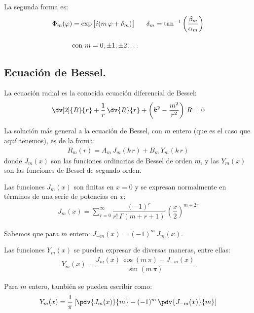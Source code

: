La segunda forma es:
\begin{align*}
\Phi_{m} (\varphi) &= \exp\big[ i (m \, \varphi + \delta_{m}) \big] \hspace{0.6cm} \delta_{m} = \tan^{-1} \left( \dfrac{\beta_{m}}{\alpha_{m}}\right) \\[1em]
&\mbox{con } m = 0, \pm 1, \pm 2, \ldots
\end{align*}

\subsection{Ecuación de Bessel.}

La ecuación radial es la conocida ecuación diferencial de Bessel:
\begin{align*}
\dv[2]{R}{r} + \dfrac{1}{r} \, \dv{R}{r} + \left( k^{2} - \dfrac{m^{2}}{r^{2}} \right) \, R = 0
\end{align*}

La solución más general a la ecuación de Bessel, con $m$ entero (que es el caso que aquí tenemos), es de la forma:
\begin{align*}
R_{m} (r) = A_{m} \, J_{m} (k \, r) + B_{m} \, Y_{m} (k \, r)
\end{align*}
donde $J_{m} (x)$ son las funciones ordinarias de Bessel de orden $m$, y las $Y_{m} (x)$ son las funciones de Bessel de segundo orden.
\par
Las funciones $J_{m} (x)$ son finitas en $x = 0$ y se expresan normalmente en términos de una serie de potencias en $x$:
\begin{align*}
J_{m} (x) = \sum_{r=0}^{\infty} \dfrac{(-1)^{r}}{r! \, \Gamma(m + r + 1)} \, \left( \dfrac{x}{2} \right)^{m+2r}
\end{align*}

Sabemos que para $m$ entero: $J_{-m} (x) = (-1)^{m} \, J_{m} (x)$.
\par
Las funciones $Y_{m} (x)$ se pueden expresar de diversas maneras, entre ellas:
\begin{align*}
Y_{m}(x) = \dfrac{J_{m}(x) \, \cos (m \, \pi) - J_{-m}(x)}{\sin (m \, \pi)}
\end{align*}

Para $m$ entero, también se pueden escribir como:
\begin{align*}
Y_{m}(x) = \dfrac{1}{\pi} \left[ \pdv{J_{m}(x)}{m} - (-1)^{m} \, \pdv{J_{-m}(x)}{m} \right]
\end{align*}

